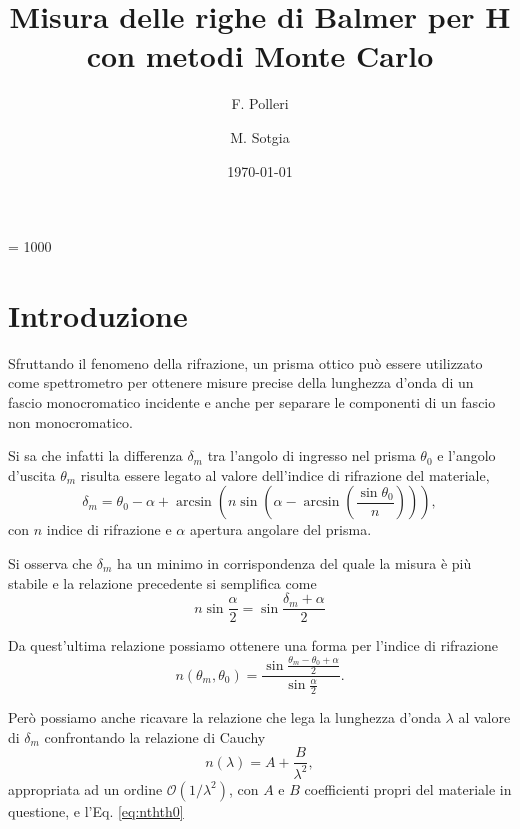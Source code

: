 \documentclass[a4paper,aps,12pt,tightenlines]{revtex4-2}
\begin{document}
\count\footins = 1000
\title{Misura delle righe di Balmer per H con metodi Monte Carlo}
\author{F. Polleri}
\author{M. Sotgia}
\date{\today}
\maketitle

\section{Introduzione}
Sfruttando il fenomeno della rifrazione, un prisma ottico può essere utilizzato come spettrometro per ottenere misure precise della lunghezza d'onda di un fascio monocromatico incidente e anche per separare le componenti di un fascio non monocromatico. 

Si sa che infatti la differenza $\delta_m$ tra l'angolo di ingresso nel prisma $\theta_0$ e l'angolo d'uscita $\theta_m$ risulta essere legato al valore dell'indice di rifrazione del materiale, \begin{equation}\delta_m = \theta_0 - \alpha+\arcsin\left(n\sin\left(\alpha - \arcsin\left(\frac{\sin\theta_0}{n}\right)\right)\right),\end{equation} con $n$ indice di rifrazione e $\alpha$ apertura angolare del prisma. 

Si osserva che $\delta_m$ ha un minimo in corrispondenza del quale la misura è più stabile e la relazione precedente si semplifica come \begin{equation} n\sin\frac{\alpha}{2} = \sin\frac{\delta_m + \alpha}{2} \end{equation}

Da quest'ultima relazione possiamo ottenere una forma per l'indice di rifrazione \begin{equation} n(\theta_m, \theta_0) = \frac{\sin\frac{\theta_m-\theta_0 + \alpha}{2}}{\sin\frac{\alpha}{2}}.\label{eq:nthth0}\end{equation}

Però possiamo anche ricavare la relazione che lega la lunghezza d'onda $\lambda$ al valore di $\delta_m$ confrontando la relazione di Cauchy \begin{equation} n(\lambda) = A + \frac{B}{\lambda^2},\end{equation} appropriata ad un ordine $\mathcal O (1/\lambda^2)$, con $A$ e $B$ coefficienti propri del materiale in questione, e l'Eq. \eqref{eq:nthth0}
\end{document}
